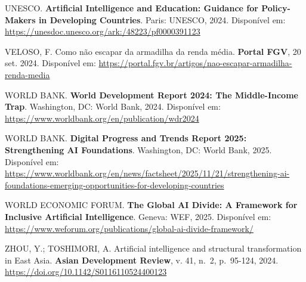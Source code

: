 \documentclass[
  brazilian,
  12pt,
]{article}
\begin{document}
UNESCO. \textbf{Artificial Intelligence and Education: Guidance for Policy-Makers in Developing Countries}. Paris: UNESCO, 2024. Disponível em: \url{https://unesdoc.unesco.org/ark:/48223/pf0000391123}

VELOSO, F. Como não escapar da armadilha da renda média. \textbf{Portal FGV}, 20 set. 2024. Disponível em: \url{https://portal.fgv.br/artigos/nao-escapar-armadilha-renda-media}

WORLD BANK. \textbf{World Development Report 2024: The Middle-Income Trap}. Washington, DC: World Bank, 2024. Disponível em: \url{https://www.worldbank.org/en/publication/wdr2024}

WORLD BANK. \textbf{Digital Progress and Trends Report 2025: Strengthening AI Foundations}. Washington, DC: World Bank, 2025. Disponível em: \url{https://www.worldbank.org/en/news/factsheet/2025/11/21/strengthening-ai-foundations-emerging-opportunities-for-developing-countries}

WORLD ECONOMIC FORUM. \textbf{The Global AI Divide: A Framework for Inclusive Artificial Intelligence}. Geneva: WEF, 2025. Disponível em: \url{https://www.weforum.org/publications/global-ai-divide-framework/}

ZHOU, Y.; TOSHIMORI, A. Artificial intelligence and structural transformation in East Asia. \textbf{Asian Development Review}, v. 41, n.~2, p.~95-124, 2024. \url{https://doi.org/10.1142/S0116110524400123}
\end{document}
